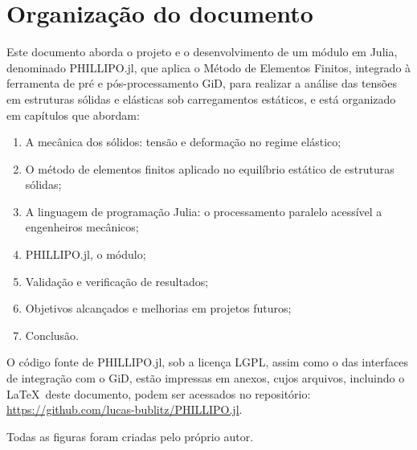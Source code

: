 \section{Organização do documento}

Este documento aborda o projeto e o desenvolvimento de um módulo em Julia, denominado PHILLIPO.jl, que aplica o Método de Elementos Finitos, integrado à ferramenta de pré e pós-processamento GiD, para realizar a análise das tensões em estruturas sólidas e elásticas sob carregamentos estáticos, e está organizado em capítulos que abordam:

\begin{enumerate}
    \item A mecânica dos sólidos: tensão e deformação no regime elástico;
    \item O método de elementos finitos aplicado no equilíbrio estático de estruturas sólidas;
    \item A linguagem de programação Julia: o processamento paralelo acessível a engenheiros mecânicos;
    \item PHILLIPO.jl, o módulo;
    \item Validação e verificação de resultados;
    \item Objetivos alcançados e melhorias em projetos futuros;
    \item Conclusão.
\end{enumerate}

O código fonte de PHILLIPO.jl, sob a licença LGPL, assim como o das interfaces de integração com o GiD, estão impressas em anexos, cujos arquivos, incluindo o \LaTeX\ deste documento, podem ser acessados no repositório: \url{https://github.com/lucas-bublitz/PHILLIPO.jl}.

Todas as figuras foram criadas pelo próprio autor.